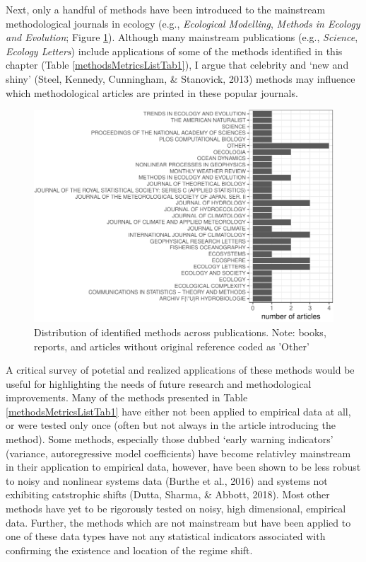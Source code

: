 \documentclass[12pt,twoside,openany]{reedthesis}
\begin{document}
Next, only a handful of methods have been introduced to the mainstream methodological journals in ecology (e.g., \emph{Ecological Modelling}, \emph{Methods in Ecology and Evolution}; Figure \ref{fig:jrnlDistFig}). Although many mainstream publications (e.g., \emph{Science}, \emph{Ecology Letters}) include applications of some of the methods identified in this chapter (Table \ref{methodsMetricsListTab1}), I argue that celebrity and `new and shiny' (Steel, Kennedy, Cunningham, \& Stanovick, 2013) methods may influence which methodological articles are printed in these popular journals.
\begin{figure}

{\centering \includegraphics[width=0.85\linewidth]{_myDissertation_files/figure-latex/jrnlDistFig-1} 

}

\caption{Distribution of identified methods across publications. Note: books, reports, and articles without original reference coded as 'Other'}\label{fig:jrnlDistFig}
\end{figure}
A critical survey of potetial and realized applications of these methods would be useful for highlighting the needs of future research and methodological improvements. Many of the methods presented in Table \ref{methodsMetricsListTab1} have either not been applied to empirical data at all, or were tested only once (often but not always in the article introducing the method). Some methods, especially those dubbed `early warning indicators' (variance, autoregressive model coefficients) have become relativley mainstream in their application to empirical data, however, have been shown to be less robust to noisy and nonlinear systems data (Burthe et al., 2016) and systems not exhibiting catstrophic shifts (Dutta, Sharma, \& Abbott, 2018). Most other methods have yet to be rigorously tested on noisy, high dimensional, empirical data. Further, the methods which are not mainstream but have been applied to one of these data types have not any statistical indicators associated with confirming the existence and location of the regime shift.
\end{document}
